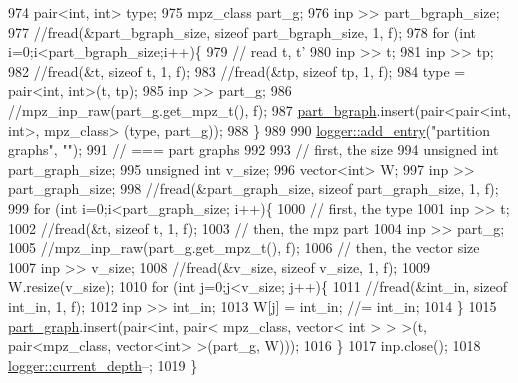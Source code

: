 \begin{DoxyCode}
974   pair<int, int> type; 
975   mpz\_class part\_g;
976   inp >> part\_bgraph\_size;
977   \textcolor{comment}{//fread(&part\_bgraph\_size, sizeof part\_bgraph\_size, 1, f);}
978   \textcolor{keywordflow}{for} (\textcolor{keywordtype}{int} i=0;i<part\_bgraph\_size;i++)\{
979     \textcolor{comment}{// read t, t'}
980     inp >> t;
981     inp >> tp;
982     \textcolor{comment}{//fread(&t, sizeof t, 1, f);}
983     \textcolor{comment}{//fread(&tp, sizeof tp, 1, f);}
984     type = pair<int, int>(t, tp);
985     inp >> part\_g;
986     \textcolor{comment}{//mpz\_inp\_raw(part\_g.get\_mpz\_t(), f);}
987     \hyperlink{classmarked__graph__compressed_a7b3267063fba30b45eb21b3ba4e07536}{part\_bgraph}.insert(pair<pair<int, int>, mpz\_class> (type, part\_g));
988   \}
989 
990   \hyperlink{classlogger_a710163deb17bc81f70d53d285b8ac9ac}{logger::add\_entry}(\textcolor{stringliteral}{"partition graphs"}, \textcolor{stringliteral}{""});
991   \textcolor{comment}{// === part graphs}
992 
993   \textcolor{comment}{// first, the size}
994   \textcolor{keywordtype}{unsigned} \textcolor{keywordtype}{int} part\_graph\_size;
995   \textcolor{keywordtype}{unsigned} \textcolor{keywordtype}{int} v\_size;
996   vector<int> W; 
997   inp >> part\_graph\_size;
998   \textcolor{comment}{//fread(&part\_graph\_size, sizeof part\_graph\_size, 1, f);}
999   \textcolor{keywordflow}{for} (\textcolor{keywordtype}{int} i=0;i<part\_graph\_size; i++)\{
1000     \textcolor{comment}{// first, the type}
1001     inp >> t; 
1002     \textcolor{comment}{//fread(&t, sizeof t, 1, f);}
1003     \textcolor{comment}{// then, the mpz part}
1004     inp >> part\_g;
1005     \textcolor{comment}{//mpz\_inp\_raw(part\_g.get\_mpz\_t(), f);}
1006     \textcolor{comment}{// then, the vector size}
1007     inp >> v\_size;
1008     \textcolor{comment}{//fread(&v\_size, sizeof v\_size, 1, f);}
1009     W.resize(v\_size);
1010     \textcolor{keywordflow}{for} (\textcolor{keywordtype}{int} j=0;j<v\_size; j++)\{
1011       \textcolor{comment}{//fread(&int\_in, sizeof int\_in, 1, f);}
1012       inp >> int\_in;
1013       W[j] = int\_in; \textcolor{comment}{//= int\_in;}
1014     \}
1015     \hyperlink{classmarked__graph__compressed_ae179a4737e6eab905c18a94d44ef64b7}{part\_graph}.insert(pair<\textcolor{keywordtype}{int}, pair< mpz\_class, vector< int > > >(t, pair<mpz\_class, vector<int>
       >(part\_g, W)));
1016   \}
1017   inp.close();
1018   \hyperlink{classlogger_a9d29b49bd318a719a8e85b59eac54fe0}{logger::current\_depth}--;
1019 \}
\end{DoxyCode}
\mbox{\label{classmarked__graph__compressed_ab9cdb7fc43badd58fb5202f74ffac723}} 
